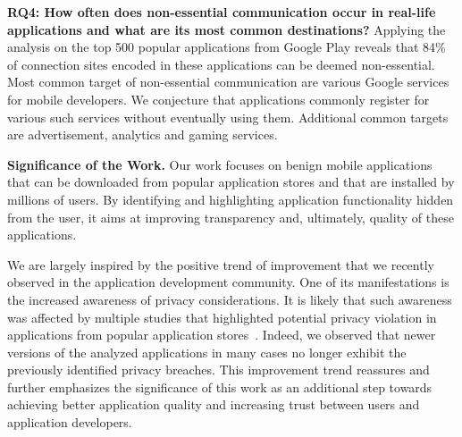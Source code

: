 \vspace{0.1in}
\noindent 
{\bf RQ4: How often does non-essential communication occur in real-life applications and what are its most common destinations?}
Applying the analysis on the top 500 popular applications from Google Play reveals that 84\% of connection sites encoded in these applications can be deemed non-essential.
Most common target of non-essential communication are various Google services for mobile developers. We conjecture 
that applications commonly register for various such services without eventually using them. 
Additional common targets are advertisement, analytics and gaming services. 

\vspace{0.1in}
\noindent 
{\bf Significance of the Work.}
Our work focuses on benign mobile applications that can be downloaded from popular application stores and that are installed by millions of users.
By identifying and highlighting application functionality hidden from the user, it aims at improving transparency and, ultimately, quality of these applications. 
 
We are largely inspired by the positive trend of improvement that we recently observed in the application development community.
One of its manifestations is the increased awareness of privacy considerations. It is likely that such awareness was affected by multiple studies that highlighted
potential privacy violation in applications from popular application stores~\cite{Enck:Gilbert:Chun:Cox:Jung:McDaniel:Sheth:OSDI10, Egele:Kruegel:Kirda:Vign:NDSS11,Tripp:Rubin:SEC14}.
Indeed, we observed that newer versions of the analyzed applications in many cases no longer exhibit the previously identified privacy breaches.  
This improvement trend reassures and further emphasizes the significance of this work as an additional step towards achieving better application quality and increasing trust between users and application developers. 





